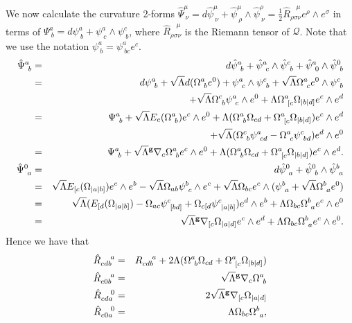 We now calculate the curvature 2-forms $\hat{\Psi}_{\ \nu}^{\mu}={d}\hat{\psi}_{\ \nu}^{\mu}+\hat{\psi}_{\ \rho}^{\mu}\wedge\hat{\psi}_{\ \nu}^{\rho}=\frac{1}{2}\hat{R}_{\rho\sigma\nu}^{\ \ \ \ \mu}e^{\rho}\wedge e^{\sigma}$
in terms of $\Psi_{\ b}^{a}={d}\psi_{\ b}^{a}+\psi_{\ c}^{a}\wedge\psi_{\ b}^{c}$,
where $\hat{R}_{\rho\sigma\nu}^{\ \ \ \ \mu}$ is the Riemann
tensor of $\mathcal{Q}$. Note that we use the notation $\psi_{\ b}^{a}=\psi_{\ bc}^{a}e^{c}$. 
\begin{eqnarray*}
\hat{\Psi}_{\ b}^{a} & = & {d}\hat{\psi}_{\ b}^{a}+\hat{\psi}_{\ c}^{a}\wedge\hat{\psi}_{\ b}^{c}+\hat{\psi}_{\ 0}^{a}\wedge\hat{\psi}_{\ b}^{0}\\
 & = & {d}\psi_{\ b}^{a}+{\sqrt{\Lambda}{d}}(\Omega_{\ b}^{a}e^{0})+\psi_{\ c}^{a}\wedge\psi_{\ b}^{c}+\sqrt{\Lambda}\Omega_{\ c}^{a}e^{0}\wedge\psi_{\ b}^{c}\\
 & &+ \sqrt{\Lambda}\Omega_{\ b}^{c}\psi_{\ c}^{a}\wedge e^{0}+\Lambda\Omega_{\ [c}^{a}\Omega_{|b|d]}e^{c}\wedge e^{d}\\
& = & \Psi_{\ b}^{a}+\sqrt{\Lambda}E_{c}(\Omega_{\ b}^{a})e^{c}\wedge e^{0}+\Lambda(\Omega_{\ b}^{a}\Omega_{cd}+\Omega_{\ [c}^{a}\Omega_{|b|d]})e^{c}\wedge e^{d}\\
& &+\sqrt{\Lambda}(\Omega_{\ b}^{c}\psi_{\ cd}^{a}-\Omega_{\ c}^{a}\psi_{\ bd}^{c})e^{d}\wedge e^{0}\\
 & = & \Psi_{\ b}^{a}+\sqrt{\Lambda}{^{\bf g}\nabla}_{c}\Omega_{\ b}^{a}e^{c}\wedge e^{0}+\Lambda(\Omega_{\ b}^{a}\Omega_{cd}+\Omega_{\ [c}^{a}\Omega_{|b|d]})e^{c}\wedge e^{d}.\\
\hat{\Psi}_{\ a}^{0} & = & {d}\hat{\psi}_{\ a}^{0}+\hat{\psi}_{\ b}^{0}\wedge\hat{\psi}_{\ a}^{b}\\
 & = & \sqrt{\Lambda}E_{[c}(\Omega_{|a|b]})e^{c}\wedge e^{b}-\sqrt{\Lambda}\Omega_{ab}\psi_{\ c}^{b}\wedge e^{c}+\sqrt{\Lambda}\Omega_{bc}e^{c}\wedge(\psi_{\ a}^{b}+\sqrt{\Lambda}\Omega_{\ a}^{b}e^{0})\\
 & = & \sqrt{\Lambda}(E_{[d}(\Omega_{|a|b]})-\Omega_{ac}\psi_{\ [bd]}^{c}+\Omega_{c[d}\psi_{\ |a|b]}^{c})e^{d}\wedge e^{b}+\Lambda\Omega_{bc}\Omega_{\ a}^{b}e^{c}\wedge e^{0}\\
 & = & \sqrt{\Lambda}{^{\bf g}\nabla}_{[c}\Omega_{|a|d]}e^{c}\wedge e^{d}+\Lambda\Omega_{bc}\Omega_{\ a}^{b}e^{c}\wedge e^{0}.
\end{eqnarray*}
Hence we have that
\begin{eqnarray*}
\hat{R}_{cdb}^{\ \ \ a} & = & R_{cdb}^{\ \ \ a}+2\Lambda(\Omega_{\ b}^{a}\Omega_{cd}+\Omega_{\ [c}^{a}\Omega_{|b|d]})\\
\hat{R}_{c0b}^{\ \ \ a} & = & \sqrt{\Lambda}{^{\bf g}\nabla}_{c}\Omega_{\ b}^{a}\\
\hat{R}_{cda}^{\ \ \ 0} & = & 2\sqrt{\Lambda}{^{\bf g}\nabla}_{[c}\Omega_{|a|d]}\\
\hat{R}_{c0a}^{\ \ \ 0} & = & \Lambda\Omega_{bc}\Omega_{\ a}^{b},
\end{eqnarray*}
